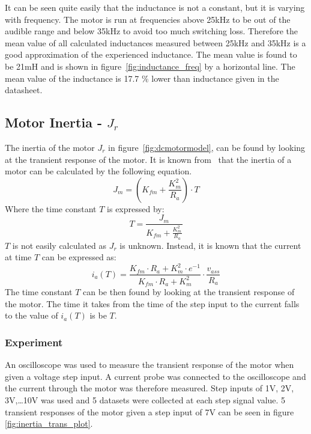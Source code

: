 It can be seen quite easily that the inductance is not a constant, but it is varying with frequency. 
The motor is run at frequencies above 25kHz to be out of the audible range and below 35kHz to avoid too much switching loss. 
Therefore the mean value of all calculated inductances measured between 25kHz and 35kHz is a good approximation of the experienced inductance.
The mean value is found to be 21mH and is shown in figure~\ref{fig:inductance_freq} by a horizontal line.
The mean value of the inductance is 17.7 $\%$ lower than inductance given in the datasheet.	

\subsection{Motor Inertia - $J_r$}
\label{sec:inertia}
The inertia of the motor $J_r$ in figure~\ref{fig:dcmotormodel}, can be found by looking at the transient response of the motor. 
It is known from~\cite{feedback} that the inertia of a motor can be calculated by the following equation.
$$J_m = (K_{fm}+\frac{K_m^2}{R_a}) \cdot T$$
Where the time constant $T$ is expressed by:
$$ T = \frac{J_m}{K_{fm}+\frac{K_m^2}{R_a}}$$
$T$ is not easily calculated as $J_r$ is unknown. Instead, it is known that the current at time $T$ can be expressed as:
$$ i_a(T) = \frac{K_{fm} \cdot R_a + K_m^2 \cdot e^{-1}}{K_{fm} \cdot R_a + K_m^2} \cdot \frac{v_{ass}}{R_a} $$
The time constant $T$ can be then found by looking at the transient response of the motor. 
The time it takes from the time of the step input to the current falls to the value of $i_a(T)$ is be $T$.

\subsubsection{Experiment}
An oscilloscope was used to measure the transient response of the motor when given a voltage step input. A current probe was connected to the oscilloscope and the current through the motor was therefore measured.
Step inputs of 1V, 2V, 3V,\dots 10V was used and 5 datasets were collected at each step signal value.  
5 transient responses of the motor given a step input of 7V can be seen in figure \ref{fig:inertia_trans_plot}.

